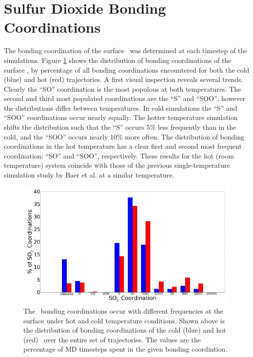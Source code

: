 \section {Sulfur Dioxide Bonding Coordinations}

The bonding coordination of the surface \suldiox~was determined at each timestep of the simulations. Figure \ref{fig:bonding-coordinations} shows the distribution of bonding coordinations of the surface \suldiox, by percentage of all bonding coordinations encountered for both the cold (blue) and hot (red) trajectories. A first visual inspection reveals several trends. Clearly the ``SO'' coordination is the most populous at both temperatures. The second and third most populated coordinations are the ``S'' and ``SOO'', however the distributions differ between temperatures. In cold simulations the ``S'' and ``SOO'' coordinations occur nearly equally. The hotter temperature simulation shifts the distribution such that the ``S'' occurs 5\% less frequently than in the cold, and the ``SOO'' occurs nearly 10\% more often. The distribution of bonding coordinations in the hot temperature has a clear first and second most frequent coordination: ``SO'' and ``SOO'', respectively. These results for the hot (room temperature) system coincide with those of the previous single-temperature simulation study by Baer et al. at a similar temperature.\cite{Baer2010}

\begin{figure}[h!]
	\begin{center}
		\includegraphics[scale=1.0]{images/coordinations/so2-coordinations-percents-small.png}
		\caption{The \suldiox~bonding coordinations occur with different frequencies at the surface under hot and cold temperature conditions. Shown above is the distribution of bonding coordinations of the cold (blue) and hot (red) \suldiox~over the entire set of trajectories. The values are the percentage of MD timesteps spent in the given bonding coordintion.}
		\label{fig:bonding-coordinations}
	\end{center}
\end{figure}

